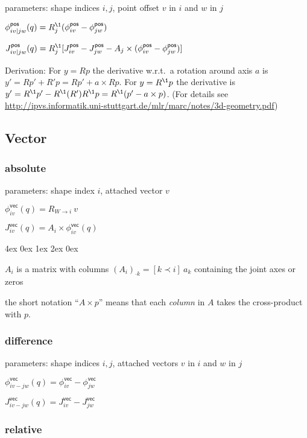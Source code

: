 \documentclass[10pt,fleqn,twoside]{article}
\newenvironment{items}{
\par\small
\begin{list}{--}{\leftmargin4ex \rightmargin0ex \labelsep1ex \labelwidth2ex
\topsep0pt \parsep0ex \itemsep3pt}
}{
\end{list}
}
\newcommand{\pos}{{\textsf{pos}}}
\newcommand{\veC}{{\textsf{vec}}}
\newcommand{\RO}[2]{R_{{#1}\rightarrow{#2}}}
\begin{document}
parameters: shape indices $i,j$, point offset $v$ in $i$ and $w$ in $j$

$\phi^\pos_{iv|jw}(q) = R_j^\1 (\phi^\pos_{iv} - \phi^\pos_{jw})$

$J^\pos_{iv|jw}(q) = R_j^\1 [J^\pos_{iv}-J^\pos_{jw} - A_j \times (\phi^\pos_{iv} - \phi^\pos_{jw})]$

Derivation: For $y=R p$ the derivative w.r.t.\ a rotation around axis
$a$ is $y' = R p' + R' p = R p' + a \times R p$. For $y=R^\1 p$ the
derivative is $y' = R^\1 p' - R^\1 (R') R^\1 p = R^\1 (p' - a \times
p)$.  (For details see
\url{http://ipvs.informatik.uni-stuttgart.de/mlr/marc/notes/3d-geometry.pdf})


\subsection{Vector}

\subsubsection{absolute}

parameters: shape index $i$, attached vector $v$

$\phi^\veC_{iv}(q) = \RO{W}{i}~ v$

$J^\veC_{iv}(q) = A_i\times \phi^\veC_{iv}(q)$
\begin{items}
\item $A_i$ is a matrix with columns $(A_i)_{\cdot k} = [k \prec i]~
a_k$ containing the joint axes or zeros
\item the short notation ``$A\times p$'' means that
   each \emph{column} in $A$ takes the cross-product with $p$.
\end{items}

\subsubsection{difference}

parameters: shape indices $i,j$, attached vectors $v$ in $i$ and $w$ in $j$

$\phi^\veC_{iv-jw}(q) = \phi^\veC_{iv} - \phi^\veC_{jw}$

$J^\veC_{iv-jw}(q) = J^\veC_{iv} - J^\veC_{jw}$

\subsubsection{relative}
\end{document}
